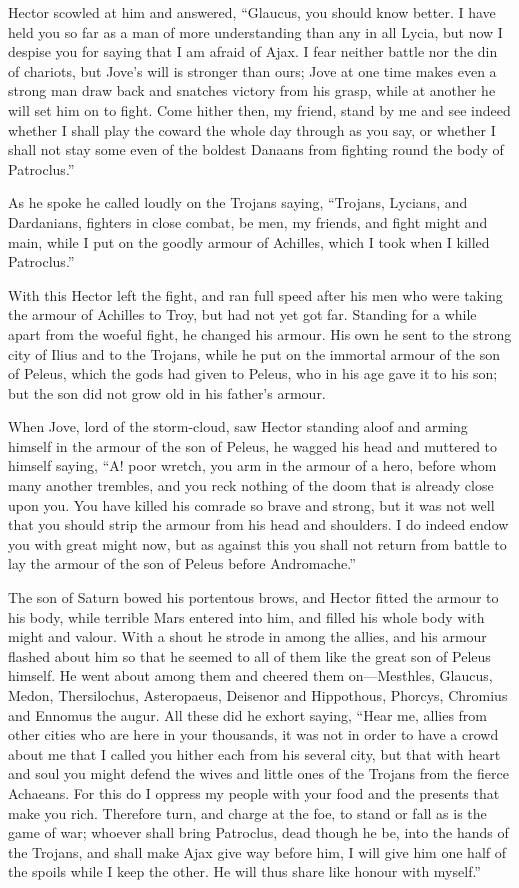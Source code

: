 Hector scowled at him and answered, “Glaucus, you should know better. I
have held you so far as a man of more understanding than any in all Lycia,
but now I despise you for saying that I am afraid of Ajax. I fear neither
battle nor the din of chariots, but Jove’s will is stronger than ours;
Jove at one time makes even a strong man draw back and snatches victory
from his grasp, while at another he will set him on to fight. Come hither
then, my friend, stand by me and see indeed whether I shall play the
coward the whole day through as you say, or whether I shall not stay some
even of the boldest Danaans from fighting round the body of Patroclus.”

As he spoke he called loudly on the Trojans saying, “Trojans, Lycians, and
Dardanians, fighters in close combat, be men, my friends, and fight might
and main, while I put on the goodly armour of Achilles, which I took when
I killed Patroclus.”

With this Hector left the fight, and ran full speed after his men who were
taking the armour of Achilles to Troy, but had not yet got far. Standing
for a while apart from the woeful fight, he changed his armour. His own he
sent to the strong city of Ilius and to the Trojans, while he put on the
immortal armour of the son of Peleus, which the gods had given to Peleus,
who in his age gave it to his son; but the son did not grow old in his
father’s armour.

When Jove, lord of the storm-cloud, saw Hector standing aloof and arming
himself in the armour of the son of Peleus, he wagged his head and
muttered to himself saying, “A! poor wretch, you arm in the armour of a
hero, before whom many another trembles, and you reck nothing of the doom
that is already close upon you. You have killed his comrade so brave and
strong, but it was not well that you should strip the armour from his head
and shoulders. I do indeed endow you with great might now, but as against
this you shall not return from battle to lay the armour of the son of
Peleus before Andromache.”

The son of Saturn bowed his portentous brows, and Hector fitted the armour
to his body, while terrible Mars entered into him, and filled his whole
body with might and valour. With a shout he strode in among the allies,
and his armour flashed about him so that he seemed to all of them like the
great son of Peleus himself. He went about among them and cheered them on—Mesthles,
Glaucus, Medon, Thersilochus, Asteropaeus, Deisenor and Hippothous,
Phorcys, Chromius and Ennomus the augur. All these did he exhort saying,
“Hear me, allies from other cities who are here in your thousands, it was
not in order to have a crowd about me that I called you hither each from
his several city, but that with heart and soul you might defend the wives
and little ones of the Trojans from the fierce Achaeans. For this do I
oppress my people with your food and the presents that make you rich.
Therefore turn, and charge at the foe, to stand or fall as is the game of
war; whoever shall bring Patroclus, dead though he be, into the hands of
the Trojans, and shall make Ajax give way before him, I will give him one
half of the spoils while I keep the other. He will thus share like honour
with myself.”

